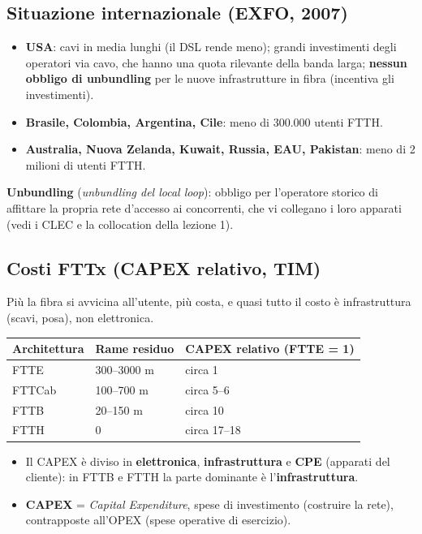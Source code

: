 \subsection{Situazione internazionale (EXFO, 2007)}

\begin{itemize}
\tightlist
\item
  \textbf{USA}: cavi in media lunghi (il DSL rende meno); grandi investimenti degli operatori via cavo, che hanno una quota rilevante della banda larga; \textbf{nessun obbligo di unbundling} per le nuove infrastrutture in fibra (incentiva gli investimenti).
\item
  \textbf{Brasile, Colombia, Argentina, Cile}: meno di 300.000 utenti FTTH.
\item
  \textbf{Australia, Nuova Zelanda, Kuwait, Russia, EAU, Pakistan}: meno di 2 milioni di utenti FTTH.
\end{itemize}

\textbf{Unbundling} (\emph{unbundling del local loop}): obbligo per l'operatore storico di affittare la propria rete d'accesso ai concorrenti, che vi collegano i loro apparati (vedi i CLEC e la collocation della lezione 1).

\subsection{Costi FTTx (CAPEX relativo, TIM)}

\begin{inbreve}

Più la fibra si avvicina all'utente, più costa, e quasi tutto il costo è infrastruttura (scavi, posa), non elettronica.

\end{inbreve}

\begin{longtable}[]{@{}lll@{}}
\toprule\noalign{}
Architettura & Rame residuo & CAPEX relativo (FTTE = 1) \\
\midrule\noalign{}
\endhead
\bottomrule\noalign{}
\endlastfoot
FTTE & 300--3000 m & circa 1 \\
FTTCab & 100--700 m & circa 5--6 \\
FTTB & 20--150 m & circa 10 \\
FTTH & 0 & circa 17--18 \\
\end{longtable}

\begin{itemize}
\tightlist
\item
  Il CAPEX è diviso in \textbf{elettronica}, \textbf{infrastruttura} e \textbf{CPE} (apparati del cliente): in FTTB e FTTH la parte dominante è l'\textbf{infrastruttura}.
\item
  \textbf{CAPEX} = \emph{Capital Expenditure}, spese di investimento (costruire la rete), contrapposte all'OPEX (spese operative di esercizio).
\end{itemize}

